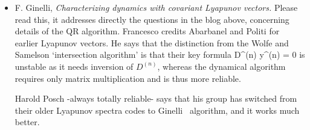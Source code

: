 \begin{itemize}
  \item F. Ginelli, {\em Characterizing dynamics with
      covariant Lyapunov vectors.} Please read this, it
      addresses directly the questions in the blog above,
      concerning details of the QR algorithm. Francesco
      credits Abarbanel \etal{} and
      Politi \etal{} for earlier Lyapunov
      vectors. He says that the distinction from the Wolfe
      and Samelson `intersection algorithm' is
      that their key formula \beq
   D^{(n)}  y^{(n)} = 0  is unstable as it
  needs inversion of $D^{(n)}$, whereas the dynamical
  algorithm requires only matrix multiplication and is thus
  more reliable.

Harold Posch -always totally reliable- says that his group
has switched from their older Lyapunov spectra codes to
Ginelli \etal\ algorithm, and it works much better.


\end{itemize}

